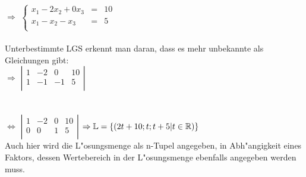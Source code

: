 \documentclass[../MAIN/main.tex]{subfiles}
\begin{document}
$\Rightarrow$ $\left\{ \begin{array}{rcl}
x_{1}-2x_{2}+0x_{3}&=&10\\
x_{1}-x_{2}-x_{3}& =& 5\\
\end{array}\right.$\\
\\
Unterbestimmte LGS erkennt man daran, dass es mehr unbekannte als Gleichungen gibt:\\

$\Rightarrow$ $\left\vert \begin{array}{rccl}
1&-2&0&10\\
1&-1&-1& 5 \\
\end{array}\right\vert$\\
\\
\\
$\Leftrightarrow$ $\left\vert \begin{array}{rccl}
1&-2&0&10\\
0&0&1&5 \\
\end{array}\right\vert$  \qquad $\Rightarrow \mathbb{L}=\{(2t+10;t;t+5|t\in\mathbb{R}) \}$ \\

Auch hier wird die L"osungsmenge als n-Tupel angegeben, in Abh"angigkeit eines Faktors, dessen Wertebereich in der L"osungsmenge ebenfalls angegeben werden muss.\\\\
\end{document}
